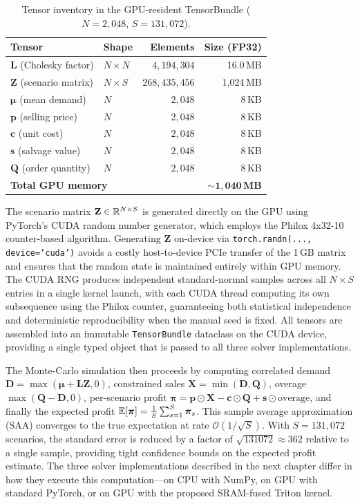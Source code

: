 \begin{table}[H]
\centering
\caption{Tensor inventory in the GPU-resident TensorBundle ($N=2{,}048$, $S=131{,}072$).}
\label{tab:tensor-inventory}
\begin{tabular}{llrr}
\toprule
\textbf{Tensor} & \textbf{Shape} & \textbf{Elements} & \textbf{Size (FP32)} \\
\midrule
$\mathbf{L}$ (Cholesky factor) & $N \times N$ & $4{,}194{,}304$ & 16.0\,MB \\
$\mathbf{Z}$ (scenario matrix) & $N \times S$ & $268{,}435{,}456$ & 1{,}024\,MB \\
$\bm{\mu}$ (mean demand) & $N$ & $2{,}048$ & 8\,KB \\
$\mathbf{p}$ (selling price) & $N$ & $2{,}048$ & 8\,KB \\
$\mathbf{c}$ (unit cost) & $N$ & $2{,}048$ & 8\,KB \\
$\mathbf{s}$ (salvage value) & $N$ & $2{,}048$ & 8\,KB \\
$\mathbf{Q}$ (order quantity) & $N$ & $2{,}048$ & 8\,KB \\
\midrule
\multicolumn{3}{l}{\textbf{Total GPU memory}} & $\mathbf{\sim 1{,}040}$\,\textbf{MB} \\
\bottomrule
\end{tabular}
\end{table}

The scenario matrix $\mathbf{Z} \in \mathbb{R}^{N \times S}$ is generated directly on the GPU using PyTorch's CUDA random number generator, which employs the Philox 4x32-10 counter-based algorithm. Generating $\mathbf{Z}$ on-device via \texttt{torch.randn(..., device='cuda')} avoids a costly host-to-device PCIe transfer of the 1\,GB matrix and ensures that the random state is maintained entirely within GPU memory. The CUDA RNG produces independent standard-normal samples across all $N \times S$ entries in a single kernel launch, with each CUDA thread computing its own subsequence using the Philox counter, guaranteeing both statistical independence and deterministic reproducibility when the manual seed is fixed. All tensors are assembled into an immutable \texttt{TensorBundle} dataclass on the CUDA device, providing a single typed object that is passed to all three solver implementations.

The Monte-Carlo simulation then proceeds by computing correlated demand $\mathbf{D} = \max(\bm{\mu} + \mathbf{L}\mathbf{Z}, 0)$, constrained sales $\mathbf{X} = \min(\mathbf{D}, \mathbf{Q})$, overage $\max(\mathbf{Q} - \mathbf{D}, 0)$, per-scenario profit $\bm{\pi} = \mathbf{p} \odot \mathbf{X} - \mathbf{c} \odot \mathbf{Q} + \mathbf{s} \odot \text{overage}$, and finally the expected profit $\mathbb{E}[\bm{\pi}] = \frac{1}{S}\sum_{s=1}^{S} \bm{\pi}_s$. This sample average approximation (SAA) converges to the true expectation at rate $\mathcal{O}(1/\sqrt{S})$. With $S = 131{,}072$ scenarios, the standard error is reduced by a factor of $\sqrt{131072} \approx 362$ relative to a single sample, providing tight confidence bounds on the expected profit estimate. The three solver implementations described in the next chapter differ in how they execute this computation---on CPU with NumPy, on GPU with standard PyTorch, or on GPU with the proposed SRAM-fused Triton kernel.
